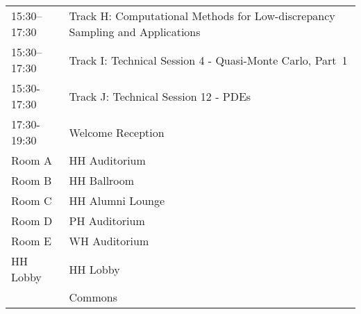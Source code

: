 \begin{table}
{\begin{tabularx}{\textwidth}{>{\hsize=0.32\hsize}X|>{\hsize=1.7\hsize}X}
\cellcolor{\SessionTitleColor}15:30–17:30 & \cellcolor{\SessionTitleColor}Track H: Computational Methods for Low-discrepancy Sampling and Applications \\
\cellcolor{\SessionLightColor}15:30–17:30 & \cellcolor{\SessionLightColor}Track I: Technical Session 4 - Quasi-Monte Carlo, Part~1 \\
\cellcolor{\SessionLightColor}15:30-17:30 & \cellcolor{\SessionLightColor}Track J: Technical Session 12 - PDEs \\
\cellcolor{\EmptyColor}17:30-19:30 & \cellcolor{\EmptyColor}Welcome Reception \\
\cellcolor{\SessionTitleColor}Room A & \cellcolor{\SessionTitleColor}HH Auditorium \\
\cellcolor{\SessionTitleColor}Room B & \cellcolor{\SessionTitleColor}HH Ballroom \\
\cellcolor{\SessionTitleColor}Room C & \cellcolor{\SessionTitleColor}HH Alumni Lounge \\
\cellcolor{\SessionTitleColor}Room D & \cellcolor{\SessionTitleColor}PH Auditorium \\
\cellcolor{\SessionTitleColor}Room E & \cellcolor{\SessionTitleColor}WH Auditorium \\
\cellcolor{\SessionTitleColor}HH Lobby & \cellcolor{\SessionTitleColor}HH Lobby \\
\cellcolor{\SessionTitleColor} & \cellcolor{\SessionTitleColor}Commons \\
\hline
\end{tabularx}
}
\end{table}

